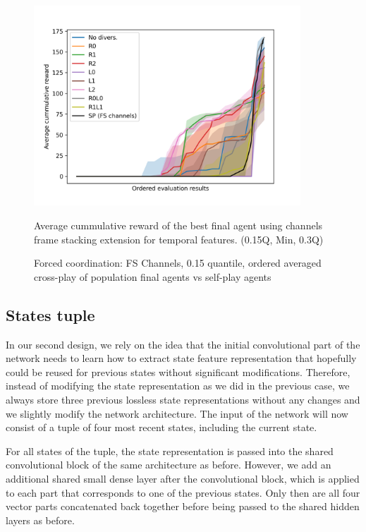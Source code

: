 \begin{figure}[!ht]
    \centering
    \includegraphics*[width=10cm]{../img/FSChannelsOrderedQ15.png}
    
    \caption{Forced coordination: FS Channels, 0.15 quantile, ordered averaged cross-play of population final agents vs self-play agents}
    \label{FSChannelsOrderedQ15}
    \medskip
    \small 
    Average cummulative reward of the best final agent using channels frame stacking extension for temporal features. 
    (0.15Q, Min, 0.3Q)

\end{figure}

\newpage

\subsection{States tuple}
In our second design, we rely on the idea that the initial convolutional part of the network needs to learn how to extract state feature representation that hopefully could be reused for previous states without significant modifications.
Therefore, instead of modifying the state representation as we did in the previous case, we always store three previous lossless state representations without any changes and we slightly modify the network architecture.
The input of the network will now consist of a tuple of four most recent states, including the current state.

For all states of the tuple, the state representation is passed into the shared convolutional block of the same architecture as before.
However, we add an additional shared small dense layer after the convolutional block, which is applied to each part that corresponds to one of the previous states.
Only then are all four vector parts concatenated back together before being passed to the shared hidden layers as before.

